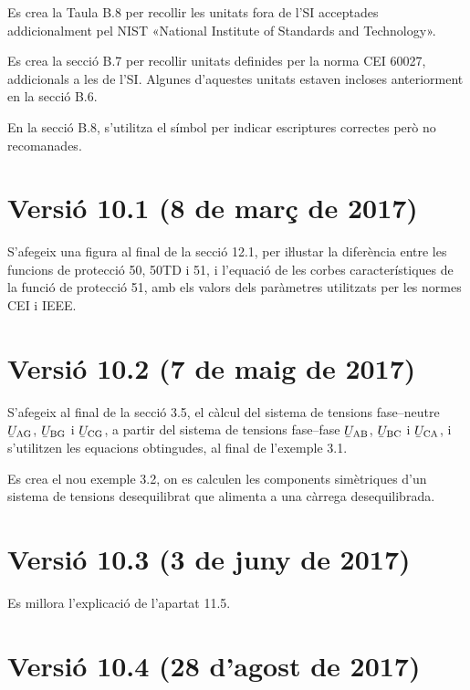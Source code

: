 Es crea la Taula B.8 per recollir les unitats fora de l'SI acceptades addicionalment pel NIST «National Institute of Standards and Technology».

Es crea la secció B.7 per recollir  unitats definides per la norma  CEI 60027, addicionals a les de l'SI. Algunes d'aquestes unitats estaven incloses anteriorment en la secció B.6.

En la secció B.8, s'utilitza el símbol \textcolor{Blue}\faQuestionCircle{} per indicar escriptures correctes però no recomanades.

\section*{Versió 10.1 (8 de març de 2017)}

S'afegeix una figura al final de la secció 12.1, per iŀlustar la diferència entre les funcions de protecció 50, 50TD i 51, i l'equació de les corbes característiques de la funció de protecció 51, amb els valors dels paràmetres utilitzats per les normes CEI i IEEE.

\section*{Versió 10.2 (7 de maig de 2017)}

S'afegeix al final de la secció 3.5, el càlcul del sistema de tensions fase--neutre $\cmplx{U}\ped{AG}$, $\cmplx{U}\ped{BG}$ i $\cmplx{U}\ped{CG}$, a partir del sistema de tensions fase--fase $\cmplx{U}\ped{AB}$, $\cmplx{U}\ped{BC}$ i $\cmplx{U}\ped{CA}$, i s'utilitzen les equacions obtingudes, al final de l'exemple 3.1.

Es crea el nou exemple 3.2, on es calculen les components simètriques d'un sistema de tensions desequilibrat que alimenta a una càrrega desequilibrada.

\section*{Versió 10.3 (3 de juny de 2017)}

Es millora l'explicació de l'apartat 11.5.

\section*{Versió 10.4 (28 d'agost de 2017)}

